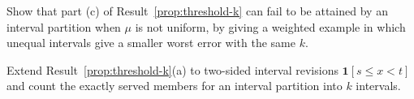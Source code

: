 \begin{exercise}
Show that part (c) of Result~\ref{prop:threshold-k} can fail to be attained by an interval partition when $\mu$ is not uniform, by giving a weighted example in which unequal intervals give a smaller worst error with the same $k$.
\end{exercise}

\begin{exercise}
Extend Result~\ref{prop:threshold-k}(a) to two-sided interval revisions $\mathbf 1[s\le x<t]$ and count the exactly served members for an interval partition into $k$ intervals.
\end{exercise}

